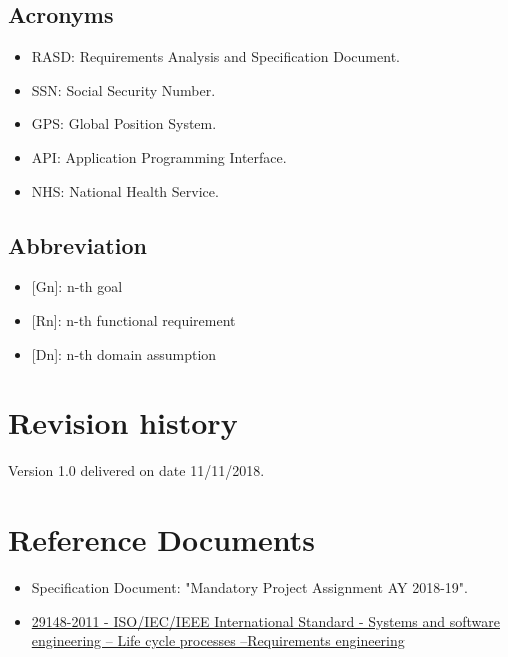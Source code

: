 \subsection{Acronyms}
\begin{itemize}
    \item RASD: Requirements Analysis and Specification Document. 
    \item SSN: Social Security Number.
    \item GPS: Global Position System.
    \item API: Application Programming Interface.
    \item NHS: National Health Service.
\end{itemize}

\subsection{Abbreviation}
\begin{itemize}
    \item {[Gn]}: n-th goal
    \item {[Rn]}: n-th functional requirement
    \item {[Dn]}: n-th domain assumption
\end{itemize}

\section{Revision history}
Version 1.0 delivered on date 11/11/2018.

\section{Reference Documents}
\begin{itemize}
    \item Specification Document: "Mandatory Project Assignment AY 2018-19". 
    \item \href{https://ieeexplore.ieee.org/document/6146379} {29148-2011 - ISO/IEC/IEEE International Standard - Systems and software engineering -- Life cycle processes --Requirements engineering}
\end{itemize}

